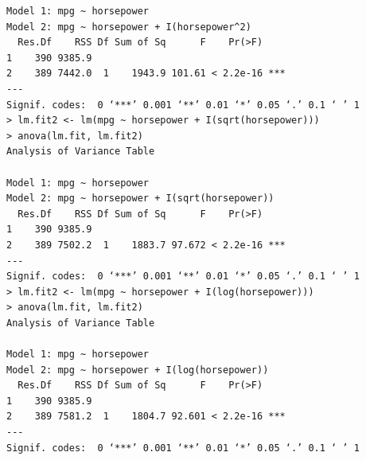 \begin{itemize}
\begin{lstlisting}
Model 1: mpg ~ horsepower
Model 2: mpg ~ horsepower + I(horsepower^2)
  Res.Df    RSS Df Sum of Sq      F    Pr(>F)
1    390 9385.9
2    389 7442.0  1    1943.9 101.61 < 2.2e-16 ***
---
Signif. codes:  0 ‘***’ 0.001 ‘**’ 0.01 ‘*’ 0.05 ‘.’ 0.1 ‘ ’ 1
> lm.fit2 <- lm(mpg ~ horsepower + I(sqrt(horsepower)))
> anova(lm.fit, lm.fit2)
Analysis of Variance Table

Model 1: mpg ~ horsepower
Model 2: mpg ~ horsepower + I(sqrt(horsepower))
  Res.Df    RSS Df Sum of Sq      F    Pr(>F)
1    390 9385.9
2    389 7502.2  1    1883.7 97.672 < 2.2e-16 ***
---
Signif. codes:  0 ‘***’ 0.001 ‘**’ 0.01 ‘*’ 0.05 ‘.’ 0.1 ‘ ’ 1
> lm.fit2 <- lm(mpg ~ horsepower + I(log(horsepower)))
> anova(lm.fit, lm.fit2)
Analysis of Variance Table

Model 1: mpg ~ horsepower
Model 2: mpg ~ horsepower + I(log(horsepower))
  Res.Df    RSS Df Sum of Sq      F    Pr(>F)
1    390 9385.9
2    389 7581.2  1    1804.7 92.601 < 2.2e-16 ***
---
Signif. codes:  0 ‘***’ 0.001 ‘**’ 0.01 ‘*’ 0.05 ‘.’ 0.1 ‘ ’ 1
        \end{lstlisting}
\end{itemize}
